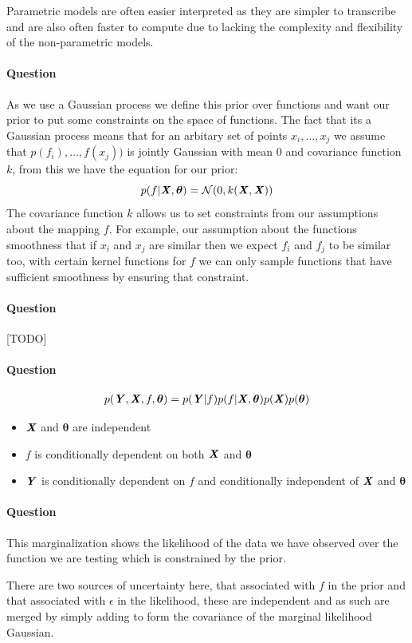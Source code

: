 \documentclass{article}
\newcounter{question}
\newcommand{\question}{\stepcounter{question}\paragraph{Question \thequestion}}
\newcommand{\mat}[1]{\textbf{\textit{#1}}}
\begin{document}
Parametric models are often easier interpreted as they are simpler to transcribe and are also often faster to compute due to lacking the complexity and flexibility of the non-parametric models.
\question As we use a Gaussian process we define this prior over functions and want our prior to put some constraints on the space of functions. The fact that its a Gaussian process means that for an arbitary set of points $x_i, \ldots, x_j$ we assume that $p(f_i), \ldots,f(x_j))$ is jointly Gaussian with mean $0$ and covariance function $k$, from this we have the equation for our prior:
$$
	p(f|\mat{X},\bm{\theta}) = \mathcal{N}(0, k(\mat{X},\mat{X}))
$$
The covariance function $k$ allows us to set constraints from our assumptions about the mapping $f$. For example, our assumption about the functions smoothness that if $x_i$ and $x_j$ are similar then we expect $f_i$ and $f_j$ to be similar too, with certain kernel functions for $f$ we can only sample functions that have sufficient smoothness by ensuring that constraint.
\question [TODO]
\question
\begin{align*}
	p(\mat{Y},\mat{X},f,\bm{\theta}) = p(\mat{Y}|f)p(f|\mat{X},\bm{\theta})p(\mat{X})p(\bm{\theta})
\end{align*}
\begin{center}
\end{center}
\begin{itemize}
	\item $\mat{X}$ and $\bm{\theta}$ are independent
	\item $f$ is conditionally dependent on both $\mat{X}$ and $\bm{\theta}$
	\item $\mat{Y}$ is conditionally dependent on $f$ and conditionally independent of $\mat{X}$ and $\bm{\theta}$
\end{itemize}
\question This marginalization shows the likelihood of the data we have observed over the function we are testing which is constrained by the prior.

There are two sources of uncertainty here, that associated with $f$ in the prior and that associated with $\epsilon$ in the likelihood, these are independent and as such are merged by simply adding to form the covariance of the marginal likelihood Gaussian.
\end{document}
